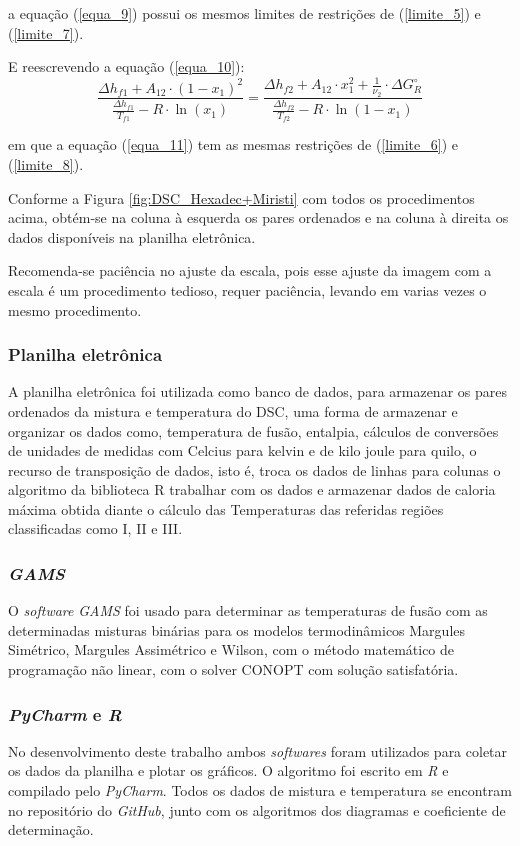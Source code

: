 a equação (\ref{equa_9}) possui os mesmos limites de restrições de (\ref{limite_5}) e (\ref{limite_7}).

E reescrevendo a equação (\ref{equa_10}):
\begin{equation}
\frac{\Delta h_{f1}+A_{12}\cdot (1-x_{1})^{2}}{\frac{\Delta h_{f1}}{T_{f1}} -R\cdot\ln(x_{1})}=\frac{\Delta h_{f2}+A_{12}\cdot x_{1}^{2} +\frac{1}{\nu_{2}}\cdot\Delta G_{R}^{\circ}}{\frac{\Delta h_{f2}}{T_{f2}} -R\cdot\ln (1-x_{1})}
\label{equa_11}
\end{equation}

em que a equação (\ref{equa_11}) tem as mesmas restrições de (\ref{limite_6}) e (\ref{limite_8}).



Conforme a Figura \ref{fig:DSC_Hexadec+Miristi} com todos os procedimentos acima, obtém-se na coluna à esquerda os pares ordenados e na coluna à direita os dados disponíveis na planilha eletrônica.

Recomenda-se paciência no ajuste da escala, pois esse ajuste da imagem com a escala é um procedimento tedioso, requer paciência, levando em varias vezes o mesmo procedimento.

\subsubsection{Planilha eletrônica}
A planilha eletrônica foi utilizada como banco de dados, para armazenar os pares ordenados da mistura e temperatura do DSC, uma forma de armazenar e organizar os dados como, temperatura de fusão, entalpia, cálculos de conversões de unidades de medidas com Celcius para kelvin e  de kilo joule para quilo, o recurso de transposição de dados, isto é, troca os dados de linhas para colunas  o algoritmo da biblioteca R trabalhar com os dados e armazenar dados de caloria máxima obtida diante o cálculo das Temperaturas das referidas regiões classificadas como I, II e III. 

\subsubsection{\textit{GAMS}}
O \textit{software} \textit{GAMS} foi usado para determinar as temperaturas de fusão com as determinadas misturas binárias para os modelos termodinâmicos Margules Simétrico, Margules Assimétrico e Wilson, com o método matemático de  programação não linear, com o solver CONOPT com solução satisfatória.

\subsubsection{\textit{PyCharm} e \textit{R}}
No desenvolvimento deste trabalho ambos \textit{softwares} foram utilizados para coletar os dados da planilha e plotar os gráficos. O algoritmo foi escrito em \textit{R} e compilado pelo \textit{PyCharm}. Todos os dados de mistura e temperatura se encontram no repositório do \textit{GitHub}, junto com os algoritmos dos diagramas e coeficiente de determinação.
